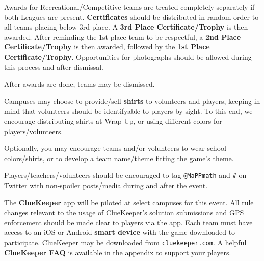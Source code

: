 Awards for Recreational/Competitive teams are treated completely separately
if both Leagues are present.
\textbf{Certificates} should be distributed in random order to all teams placing
below 3rd place. A \textbf{3rd Place Certificate/Trophy} is then awarded.
After reminding the 1st place team to be respectful, a
\textbf{2nd Place Certificate/Trophy} is then awarded, followed by the
\textbf{1st Place Certificate/Trophy}. Opportunities for photographs should
be allowed during this process and after dismissal.

After awards are done, teams may be dismissed.


Campuses may choose to provide/sell \textbf{shirts} to volunteers and players,
keeping in mind that volunteers should be identifyable to players by sight.
To this end, we encourage distributing shirts at Wrap-Up, or using different
colors for players/volunteers.

Optionally, you may encourage teams and/or volunteers to
wear school colors/shirts, or to develop a team name/theme fitting the
game's theme.


Players/teachers/volunteers should be encouraged to tag \texttt{@MaPPmath}
and \texttt{\#\phEventAbbr} on Twitter with non-spoiler posts/media during
and after the event.


The \textbf{ClueKeeper} app will be piloted at select campuses for this
event. All rule changes relevant to the usage of ClueKeeper's
solution submissions and GPS enforcement should be made clear to players
via the app. Each team must have access to an iOS or Android
\textbf{smart device} with the game downloaded to participate.
ClueKeeper may be downloaded from \texttt{cluekeeper.com}. A helpful
\textbf{ClueKeeper FAQ} is available in the appendix to support your players.

